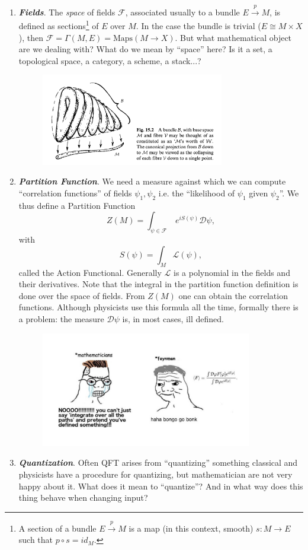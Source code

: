 \begin{enumerate}
    \item \textbf{\textit{Fields}}. The \textit{space} of fields $\mathcal{F}$, associated usually to a bundle $E\xrightarrow{p}M$, is defined as sections\footnote{A section of a bundle $E\xrightarrow{p}M$ is a map (in this context, smooth) $s:M\to E$ such that $p\circ s=id_M$.} of $E$ over $M$. In the case the bundle is trivial ($E\cong M\times X$), then $\mathcal{F}=\Gamma(M,E)=\text{Maps}(M\rightarrow X)$. But what mathematical object are we dealing with? What do we mean by ``space'' here? Is it a set, a topological space, a category, a scheme, a stack...?\\
    \begin{figure}[!ht]
        \centering
        \includegraphics[width=8cm]{images/Lecture 1/penrose.png}
    \end{figure}
    \item \textbf{\textit{Partition Function}}. We need a measure against which we can compute
     ``correlation functions'' of fields $\psi_1,\psi_2$ i.e. the ``likelihood of $\psi_1$ given
      $\psi_2$''. We thus define a Partition Function
    $$Z(M)=\int_{\psi\in\mathcal{F}}\ e^{iS(\psi)}\mathcal{D}\psi,$$
    with
    $$S(\psi)=\int_M \mathcal{L}(\psi),$$
    called the Action Functional. Generally $\mathcal{L}$ is a polynomial in the fields and their derivatives. Note that the integral in the partition function definition is done over the space of fields. From $Z(M)$ one can obtain the correlation functions. Although physicists use this formula all the time, formally there is a problem: the measure $\mathcal{D}\psi$ is, in most cases, ill defined.
    \begin{figure}[!ht]
        \centering
        \includegraphics[width=9.2cm]{images/Lecture 1/feynman.png}
    \end{figure}
    \item \textbf{\textit{Quantization}}. Often QFT arises from ``quantizing'' something classical and physicists have a procedure for quantizing, but mathematician are not very happy about it. What does it mean to ``quantize''? And in what way does this thing behave when changing input?
\end{enumerate}
